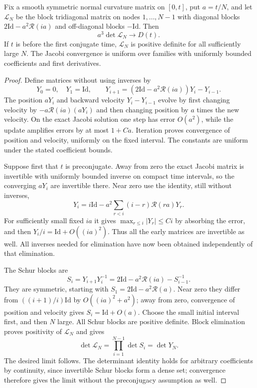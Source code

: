 \begin{lemma}\label{lem:discrete-jacobi}
Fix a smooth symmetric normal curvature matrix on $[0,t]$, put $a=t/N$,
and let $\mathcal L_N$ be the block tridiagonal matrix on nodes
$1,\ldots,N-1$ with diagonal blocks $2\mathrm{Id}-a^2\mathcal R(ia)$
and off-diagonal blocks $-\mathrm{Id}$.  Then
\[
 a^3\det\mathcal L_N\longrightarrow D(t).
\]
If $t$ is before the first conjugate time, $\mathcal L_N$ is positive
definite for all sufficiently large $N$.  The Jacobi convergence is
uniform over families with uniformly bounded coefficients and first
derivatives.
\end{lemma}
\begin{proof}
Define matrices without using inverses by
\[
 Y_0=0,\quad Y_1=\mathrm{Id},\qquad
 Y_{i+1}=(2\mathrm{Id}-a^2\mathcal R(ia))Y_i-Y_{i-1}.
\]
The position $aY_i$ and backward velocity $Y_i-Y_{i-1}$ evolve by
first changing velocity by $-a\mathcal R(ia)(aY_i)$ and then changing
position by $a$ times the new velocity.  On the exact Jacobi solution
one step has error $O(a^2)$, while the update amplifies errors by at most
$1+Ca$.  Iteration proves convergence of position and velocity, uniformly
on the fixed interval.  The constants are uniform under the stated
coefficient bounds.

Suppose first that $t$ is preconjugate.  Away from zero the exact Jacobi
matrix is invertible with uniformly bounded inverse on compact time
intervals, so the converging $aY_i$ are invertible there.  Near zero use
the identity, still without inverses,
\[
 Y_i=i\mathrm{Id}-a^2\sum_{r<i}(i-r)\mathcal R(ra)Y_r.
\]
For sufficiently small fixed $ia$ it gives $\max_{r\le i}|Y_r|\le Ci$
by absorbing the error, and then
$Y_i/i=\mathrm{Id}+O((ia)^2)$.  Thus all the early matrices are invertible
as well.  All inverses needed for elimination have now been obtained
independently of that elimination.

The Schur blocks are
\[
 S_i=Y_{i+1}Y_i^{-1}
 =2\mathrm{Id}-a^2\mathcal R(ia)-S_{i-1}^{-1}.
\]
They are symmetric, starting with
$S_1=2\mathrm{Id}-a^2\mathcal R(a)$.  Near zero they differ from
$((i+1)/i)\mathrm{Id}$ by $O((ia)^2+a^2)$; away from zero, convergence of
position and velocity gives $S_i=\mathrm{Id}+O(a)$.  Choose the small
initial interval first, and then $N$ large.  All Schur blocks are
positive definite.  Block elimination proves positivity of
$\mathcal L_N$ and gives
\[
 \det\mathcal L_N=\prod_{i=1}^{N-1}\det S_i=\det Y_N.
\]
The desired limit follows.  The determinant identity holds for arbitrary
coefficients by continuity, since invertible Schur blocks form a dense
set; convergence therefore gives the limit without the preconjugacy
assumption as well.
\end{proof}

